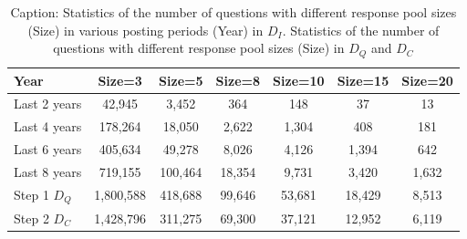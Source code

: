 \begin{table*}[t]
\centering
\renewcommand{\arraystretch}{1.1}
\tabcolsep=0.55cm
\caption{Caption: Statistics of the number of questions with different response pool sizes (Size) in various posting periods (Year) in \(D_I\). Statistics of the number of questions with different response pool sizes (Size) in \(D_Q\) and \(D_C\)}
\begin{tabular}{@{}lcccccc@{}}
\toprule
Year & Size=3 & Size=5 & Size=8 & Size=10 & Size=15 & Size=20 \\ \midrule
Last 2 years & 42,945  & 3,452  & 364    & 148    & 37     & 13     \\
Last 4 years & 178,264 & 18,050 & 2,622  & 1,304  & 408    & 181    \\
Last 6 years & 405,634 & 49,278 & 8,026  & 4,126  & 1,394  & 642    \\
Last 8 years & 719,155 & 100,464 & 18,354 & 9,731  & 3,420  & 1,632  \\ \bottomrule

Step 1 \(D_Q\) & 1,800,588 & 418,688 & 99,646 & 53,681 & 18,429 & 8,513 \\
Step 2 \(D_C\) & 1,428,796 & 311,275 & 69,300 & 37,121 & 12,952 & 6,119 \\ \bottomrule
\end{tabular}
\label{tab:statistics}
\end{table*}

